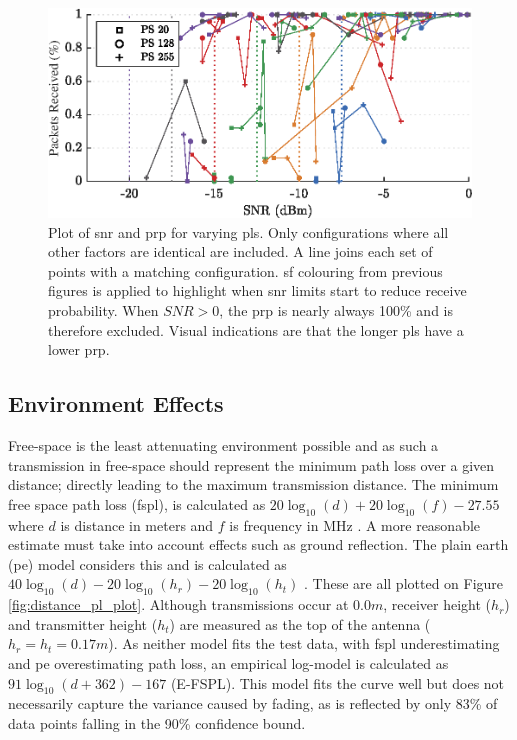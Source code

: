 \begin{figure}[H]
    \centering
   	\includegraphics{Figures/pl_pp_plot}
    \caption[Effect of Packet Length on \ac{snr} and \ac{prp}]{
    Plot of \ac{snr} and \ac{prp} for varying \ac{pl}s. Only configurations where all other factors are identical are included. A line joins each set of points with a matching configuration. \ac{sf} colouring from previous figures is applied to highlight when \ac{snr} limits start to reduce receive probability. When $SNR > 0$, the \ac{prp} is nearly always 100\% and is therefore excluded. Visual indications are that the longer \ac{pl}s have a lower \ac{prp}.
    }
    \label{fig:pl_pp_plot}
\end{figure}

\subsection{Environment Effects}
Free-space is the least attenuating environment possible and as such a transmission in free-space should represent the minimum path loss over a given distance; directly leading to the maximum transmission distance. The minimum free space path loss (\ac{fspl}), is calculated as $20\log_{10}(d) + 20\log_{10}(f) - 27.55$ where $d$ is distance in meters and $f$ is frequency in MHz \cite{3YP:ANTENNA_BOOK}. A more reasonable estimate must take into account effects such as ground reflection. The plain earth (\ac{pe}) model considers this and is calculated as $40\log_{10}(d) - 20\log_{10}(h_r) - 20\log_{10}(h_t)$ \cite{3YP:COMBINING_MODELS}. These are all plotted on Figure \ref{fig:distance_pl_plot}. Although transmissions occur at $0.0m$, receiver height ($h_r$) and transmitter height ($h_t$) are measured as the top of the antenna ($h_r = h_t = 0.17m$). As neither model fits the test data, with \ac{fspl} underestimating and \ac{pe} overestimating path loss, an empirical log-model is calculated as $91\log_{10}(d+362)-167$ (E-FSPL). This model fits the curve well but does not necessarily capture the variance caused by fading, as is reflected by only 83\% of data points falling in the 90\% confidence bound.

